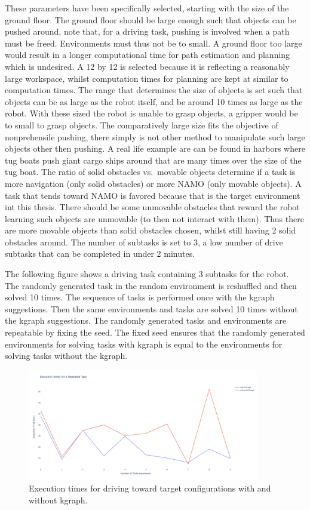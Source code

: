 These parameters have been specifically selected, starting with the size of the ground floor. The ground floor should be large enough such that objects can be pushed around, note that, for a driving task, pushing is involved when a path must be freed. Environments must thus not be to small. A ground floor too large would result in a longer computational time for path estimation and planning which is undesired. A 12 by 12 is selected because it is reflecting a reasonably large workspace, whilst computation times for planning are kept at similar to computation times. The range that determines the size of objects is set such that objects can be as large as the robot itself, and be around 10 times as large as the robot. With these sized the robot is unable to grasp objects, a gripper would be to small to grasp objects. The comparatively large size fits the objective of nonprehensile pushing, there simply is not other method to manipulate such large objects other then pushing. A real life example are can be found in harbors where tug boats push giant cargo ships around that are many times over the size of the tug boat. The ratio of solid obstacles vs.~movable objects determine if a task is more navigation (only solid obstacles) or more \ac{NAMO} (only movable objects). A task that tends toward \ac{NAMO} is favored because that is the target environment int this thesis. There should be some unmovable obstacles that reward the robot learning such objects are unmovable (to then not interact with them). Thus there are more movable objects than solid obstacles chosen, whilst still having 2 solid obstacles around. The number of subtasks is set to 3, a low number of drive subtasks that can be completed in under 2 minutes.\bs


The following figure shows a driving task containing 3 subtasks for the robot. The randomly generated task in the random environment is reshuffled and then solved 10 times. The sequence of tasks is performed once with the \ac{kgraph} suggestions. Then the same environments and tasks are solved 10 times without the \ac{kgraph} suggestions. The randomly generated tasks and environments are repeatable by fixing the seed. The fixed seed ensures that the randomly generated environments for solving tasks with \ac{kgraph} is equal to the environments for solving tasks without the \ac{kgraph}.\bs

\begin{figure}[H]
    \centering
    \includegraphics[width=0.9\textwidth]{figures/results/random_drive_execution_times}
    \caption{Execution times for driving toward target configurations with and without \ac{kgraph}.}%
    \label{fig:results_random_drive_task}
\end{figure}

